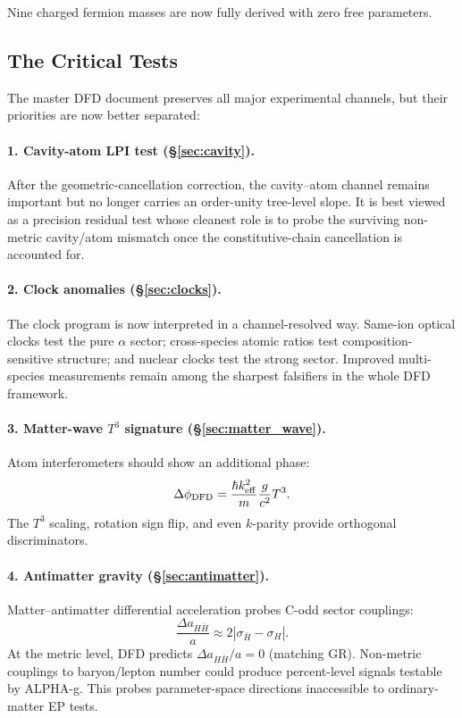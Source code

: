 Nine charged fermion masses are now fully derived with zero free parameters.

\subsection{The Critical Tests}\label{sec:conclusions-tests}

The master DFD document preserves all major experimental channels, but their priorities are now better separated:

\paragraph{1. Cavity-atom LPI test (\S\ref{sec:cavity}).}
After the geometric-cancellation correction, the cavity--atom channel remains important but no longer carries an order-unity tree-level slope. It is best viewed as a precision residual test whose cleanest role is to probe the surviving non-metric cavity/atom mismatch once the constitutive-chain cancellation is accounted for.

\paragraph{2. Clock anomalies (\S\ref{sec:clocks}).}
The clock program is now interpreted in a channel-resolved way. Same-ion optical clocks test the pure $\alpha$ sector; cross-species atomic ratios test composition-sensitive structure; and nuclear clocks test the strong sector. Improved multi-species measurements remain among the sharpest falsifiers in the whole DFD framework.

\paragraph{3. Matter-wave $T^3$ signature (\S\ref{sec:matter_wave}).}
Atom interferometers should show an additional phase:
\begin{equation}
\Delta\phi_{\rm DFD} = \frac{\hbar k_{\rm eff}^2}{m}\frac{g}{c^2}T^3.
\end{equation}
The $T^3$ scaling, rotation sign flip, and even $k$-parity provide orthogonal discriminators.

\paragraph{4. Antimatter gravity (\S\ref{sec:antimatter}).}
Matter--antimatter differential acceleration probes C-odd sector couplings:
\begin{equation}
\frac{\Delta a_{H\bar{H}}}{a} \approx 2|\sigma_{\bar{H}} - \sigma_H|.
\end{equation}
At the metric level, DFD predicts $\Delta a_{H\bar{H}}/a = 0$ (matching GR). Non-metric couplings to baryon/lepton number could produce percent-level signals testable by ALPHA-g. This probes parameter-space directions inaccessible to ordinary-matter EP tests.

